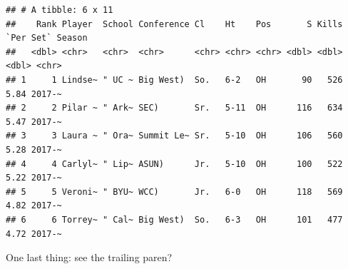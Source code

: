 \documentclass[
]{book}
\newenvironment{Shaded}{\begin{snugshade}}{\end{snugshade}}
\newcommand{\CharTok}[1]{\textcolor[rgb]{0.31,0.60,0.02}{#1}}
\newcommand{\DataTypeTok}[1]{\textcolor[rgb]{0.13,0.29,0.53}{#1}}
\newcommand{\KeywordTok}[1]{\textcolor[rgb]{0.13,0.29,0.53}{\textbf{#1}}}
\newcommand{\NormalTok}[1]{#1}
\newcommand{\OperatorTok}[1]{\textcolor[rgb]{0.81,0.36,0.00}{\textbf{#1}}}
\newcommand{\OtherTok}[1]{\textcolor[rgb]{0.56,0.35,0.01}{#1}}
\newcommand{\StringTok}[1]{\textcolor[rgb]{0.31,0.60,0.02}{#1}}
\begin{document}
\begin{Shaded}
\end{Shaded}

\begin{verbatim}
## # A tibble: 6 x 11
##    Rank Player  School Conference Cl    Ht    Pos       S Kills `Per Set` Season
##   <dbl> <chr>   <chr>  <chr>      <chr> <chr> <chr> <dbl> <dbl>     <dbl> <chr> 
## 1     1 Lindse~ " UC ~ Big West)  So.   6-2   OH       90   526      5.84 2017-~
## 2     2 Pilar ~ " Ark~ SEC)       Sr.   5-11  OH      116   634      5.47 2017-~
## 3     3 Laura ~ " Ora~ Summit Le~ Sr.   5-10  OH      106   560      5.28 2017-~
## 4     4 Carlyl~ " Lip~ ASUN)      Jr.   5-10  OH      100   522      5.22 2017-~
## 5     5 Veroni~ " BYU~ WCC)       Jr.   6-0   OH      118   569      4.82 2017-~
## 6     6 Torrey~ " Cal~ Big West)  So.   6-3   OH      101   477      4.72 2017-~
\end{verbatim}

One last thing: see the trailing paren?
\end{document}
